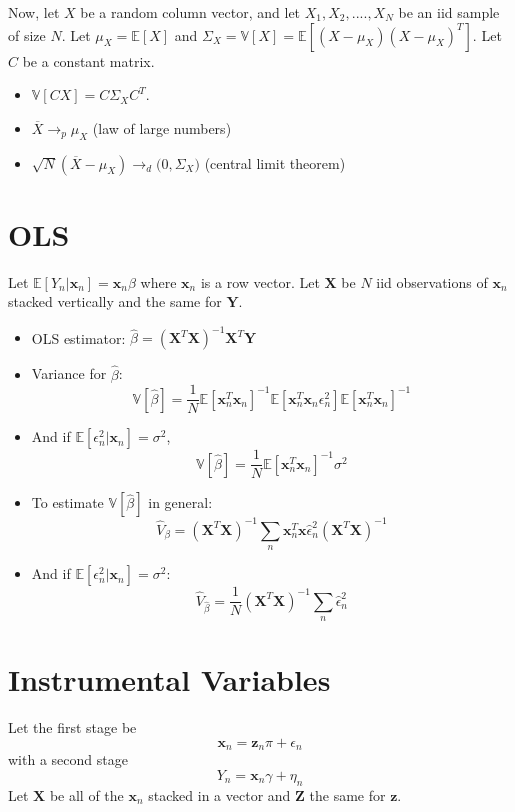\documentclass[12pt]{article}
\newcommand\ov{\overline}
\newcommand\BB{\mathbb}
\newcommand\EE{\mathbb{E}}
\newcommand\mc{\mathcal}
\numberwithin{equation}{section}
\numberwithin{figure}{section}
\numberwithin{table}{section}
\begin{document}
    Now, let $X$ be a random column vector, and let $X_1,X_2,....,X_{N}$ be an iid sample of size $N$. Let $\mu_{X}=\EE[X]$ and $\Sigma_{X} = \BB{V}[X] = \EE[(X-\mu_{X})(X-\mu_{X})^T]$. Let $C$ be a constant matrix.
  \begin{itemize}
  \item $\BB{V}[CX] = C\Sigma_{X}C^{T}$.
  \item $\ov{X}\rightarrow_{p} \mu_{X}$ (law of large numbers)
  \item $\sqrt{N}(\ov{X} - \mu_{X}) \rightarrow_{d} \mc(0,\Sigma_{X})$ (central limit theorem)
  \end{itemize}

  \section*{OLS}
  Let $\EE[Y_{n}|\bm{x}_{n}] = \bm{x}_{n}\beta$ where $\bm{x}_{n}$ is a row vector. Let $\bm{X}$ be $N$ iid observations of $\bm{x}_{n}$ stacked vertically and the same for $\bm{Y}$.
  \begin{itemize}
  \item OLS estimator: $\hat{\beta} = (\bm{X}^{T}\bm{X})^{-1}\bm{X}^{T}\bm{Y}$
  \item Variance for $\hat{\beta}$:
    \[ \BB{V}[\hat{\beta}] =  \frac{1}{N}\EE[\bm{x}_{n}^{T}\bm{x}_n]^{-1}\EE[\bm{x}^{T}_{n}\bm{x}_{n}\epsilon^2_{n}]\EE[\bm{x}_{n}^{T}\bm{x}_n]^{-1} \]
  \item And if $\EE[\epsilon^2_{n}|\bm{x}_{n}] = \sigma^2$,
        \[ \BB{V}[\hat{\beta}] =  \frac{1}{N}\EE[\bm{x}_{n}^{T}\bm{x}_n]^{-1}\sigma^2 \]
      \item  To estimate $\BB{V}[\hat{\beta}]$ in general:
        \[ \hat{V}_{\beta} = (\bm{X}^{T}\bm{X})^{-1}\sum_{n}\bm{x}^{T}_{n}\bm{x}\hat{\epsilon}_{n}^2(\bm{X}^{T}\bm{X})^{-1} \]
        
      \item And if $\EE[\epsilon^2_{n}|\bm{x}_{n}] = \sigma^2$:
        \[\hat{V}_{\hat{\beta}} = \frac{1}{N}(\bm{X}^{T}\bm{X})^{-1}\sum_{n}\hat{\epsilon}_{n}^2 \]
  \end{itemize}

  \section*{Instrumental Variables}
  Let the first stage be
  \[ \bm{x}_{n} = \bm{z}_{n}\pi + \epsilon_{n} \]
  with a second stage
  \[ Y_{n} = \bm{x}_{n}\gamma + \eta_{n} \]
  Let $\bm{X}$ be all of the $\bm{x}_{n}$ stacked in a vector and $\bm{Z}$ the same for $\bm{z}$. 
  
\end{document}
